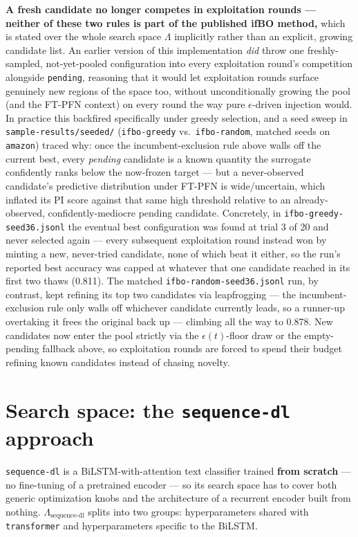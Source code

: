 \documentclass[10pt]{article}
\begin{document}
\textbf{A fresh candidate no longer competes in exploitation rounds --- neither of these two
rules is part of the published ifBO method,} which is stated over the whole search space
$\Lambda$ implicitly rather than an explicit, growing candidate list. An earlier version of
this implementation \emph{did} throw one freshly-sampled, not-yet-pooled configuration into
every exploitation round's competition alongside \texttt{pending}, reasoning that it would let
exploitation rounds surface genuinely new regions of the space too, without unconditionally
growing the pool (and the FT-PFN context) on every round the way pure $\epsilon$-driven
injection would. In practice this backfired specifically under greedy selection, and a seed
sweep in \texttt{sample-results/seeded/} (\texttt{ifbo-greedy} vs.\ \texttt{ifbo-random},
matched seeds on \texttt{amazon}) traced why: once the incumbent-exclusion rule above walls off
the current best, every \emph{pending} candidate is a known quantity the surrogate confidently
ranks below the now-frozen target --- but a never-observed candidate's predictive distribution
under FT-PFN is wide/uncertain, which inflated its PI score against that same high threshold
relative to an already-observed, confidently-mediocre pending candidate. Concretely, in
\texttt{ifbo-greedy-seed36.jsonl} the eventual best configuration was found at trial 3 of 20
and never selected again --- every subsequent exploitation round instead won by minting a new,
never-tried candidate, none of which beat it either, so the run's reported best accuracy was
capped at whatever that one candidate reached in its first two thaws (0.811). The matched
\texttt{ifbo-random-seed36.jsonl} run, by contrast, kept refining its top two candidates via
leapfrogging --- the incumbent-exclusion rule only walls off whichever candidate currently
leads, so a runner-up overtaking it frees the original back up --- climbing all the way to
0.878. New candidates now enter the pool strictly via the $\epsilon(t)$-floor draw or the
empty-pending fallback above, so exploitation rounds are forced to spend their budget refining
known candidates instead of chasing novelty.

\section*{Search space: the \texttt{sequence-dl} approach}

\texttt{sequence-dl} is a BiLSTM-with-attention text classifier trained \textbf{from scratch} --- no fine-tuning of a pretrained
encoder --- so its search space has to cover both generic optimization knobs and the
architecture of a recurrent encoder built from nothing. $\Lambda_\text{sequence-dl}$ splits into
two groups: hyperparameters shared with \texttt{transformer} and hyperparameters specific to the BiLSTM.
\end{document}
